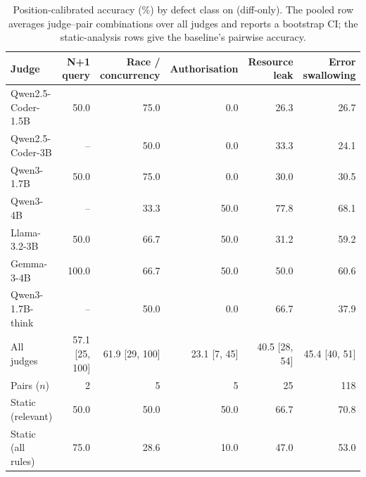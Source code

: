 \begin{table}[t]
\caption{Position-calibrated accuracy (\%) by defect class on \RJB{} (diff-only). The pooled row averages judge--pair combinations over all judges and reports a bootstrap CI; the static-analysis rows give the baseline's pairwise accuracy.}
\label{tab:classes}
\centering\footnotesize
\begin{tabular}{@{}lrrrrr@{}}
\toprule
Judge & N+1 query & Race / concurrency & Authorisation & Resource leak & Error swallowing \\
\midrule
Qwen2.5-Coder-1.5B & 50.0 & 75.0 & 0.0 & 26.3 & 26.7 \\
Qwen2.5-Coder-3B & -- & 50.0 & 0.0 & 33.3 & 24.1 \\
Qwen3-1.7B & 50.0 & 75.0 & 0.0 & 30.0 & 30.5 \\
Qwen3-4B & -- & 33.3 & 50.0 & 77.8 & 68.1 \\
Llama-3.2-3B & 50.0 & 66.7 & 50.0 & 31.2 & 59.2 \\
Gemma-3-4B & 100.0 & 66.7 & 50.0 & 50.0 & 60.6 \\
Qwen3-1.7B-think & -- & 50.0 & 0.0 & 66.7 & 37.9 \\
\midrule
All judges & 57.1 [25, 100] & 61.9 [29, 100] & 23.1 [7, 45] & 40.5 [28, 54] & 45.4 [40, 51] \\
Pairs ($n$) & 2 & 5 & 5 & 25 & 118 \\
Static (relevant) & 50.0 & 50.0 & 50.0 & 66.7 & 70.8 \\
Static (all rules) & 75.0 & 28.6 & 10.0 & 47.0 & 53.0 \\
\bottomrule
\end{tabular}
\end{table}
